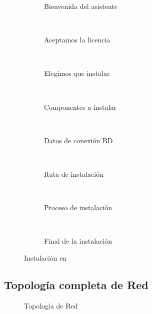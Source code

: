 \begin{figure}[H]
	\centering
	\begin{subfigure}[b]{0.3\textwidth}
		\caption{Bienvenida del asistente}
		\label{fig:Bienvenida}
	\end{subfigure}
	~
	\begin{subfigure}[b]{0.3\textwidth}
		\caption{Aceptamos la licencia}
		\label{fig:Licencia}
	\end{subfigure}
	~
	\begin{subfigure}[b]{0.3\textwidth}
		\caption{Elegimos que instalar}
		\label{fig:Elección}
	\end{subfigure}
	~
	\begin{subfigure}[b]{0.3\textwidth}
		\caption{Componentes a instalar}
		\label{fig:Componentes}
	\end{subfigure}
	~
	\begin{subfigure}[b]{0.3\textwidth}
		\caption{Datos de conexión BD}
		\label{fig:DBConn}
	\end{subfigure}
	~
	\begin{subfigure}[b]{0.3\textwidth}
		\caption{Ruta de instalación}
		\label{fig:Ruta}
	\end{subfigure}
	~
	\begin{subfigure}[b]{0.3\textwidth}
		\caption{Proceso de instalación}
		\label{fig:Instalación}
	\end{subfigure}
	~
	\begin{subfigure}[b]{0.3\textwidth}
		\caption{Final de la instalación}
		\label{fig:Final}
	\end{subfigure}
	\caption{Instalación en \win}
	\label{fig:InstalaciónWin}
\end{figure}

\subsection{Topología completa de Red}
\begin{figure}[H]
		\caption{Topología de Red}
		\label{fig:bienvenida}
\end{figure}


